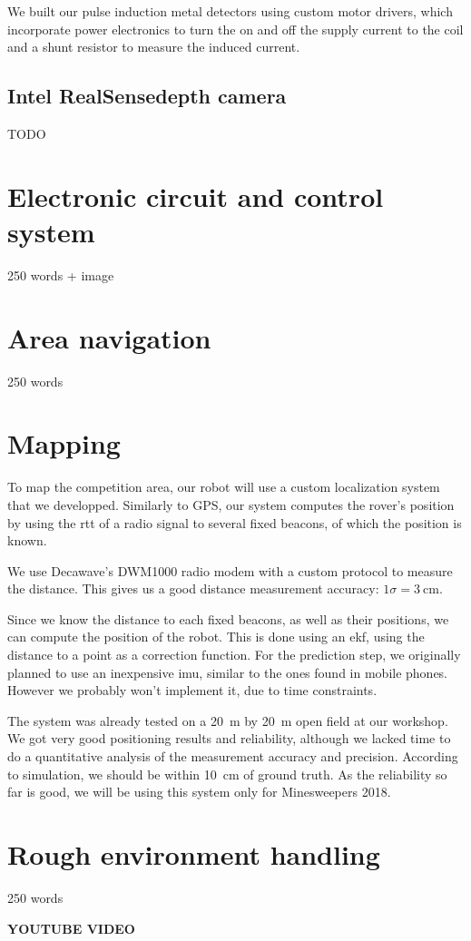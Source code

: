 We built our pulse induction metal detectors using custom motor drivers, which incorporate power electronics to turn the on and off the supply current to the coil and a shunt resistor to measure the induced current.

\subsection{Intel RealSense\texttrademark depth camera}
TODO

\section{Electronic circuit and control system}
250 words + image

\section{Area navigation}
250 words

\section{Mapping}

To map the competition area, our robot will use a custom localization system that we developped.
Similarly to GPS, our system computes the rover's position by using the \gls{rtt} of a radio signal to several fixed beacons, of which the position is known.

We use Decawave's DWM1000 radio modem with a custom protocol to measure the distance.
This gives us a good distance measurement accuracy: $1 \sigma = \SI{3}{\centi\meter}$.

Since we know the distance to each fixed beacons, as well as their positions, we can compute the position of the robot.
This is done using an \gls{ekf}, using the distance to a point as a correction function.
For the prediction step, we originally planned to use an inexpensive \gls{imu}, similar to the ones found in mobile phones.
However we probably won't implement it, due to time constraints.

The system was already tested on a \SI{20}{\meter} by \SI{20}{\meter} open field at our workshop.
We got very good positioning results and reliability, although we lacked time to do a quantitative analysis of the measurement accuracy and precision.
According to simulation, we should be within \SI{10}{\centi\meter} of ground truth.
As the reliability so far is good, we will be using this system only for Minesweepers 2018.


\section{Rough environment handling}

250 words

\textbf{YOUTUBE VIDEO}
